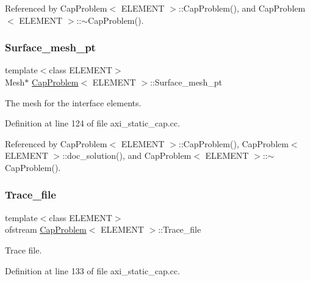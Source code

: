Referenced by Cap\+Problem$<$ E\+L\+E\+M\+E\+N\+T $>$\+::\+Cap\+Problem(), and Cap\+Problem$<$ E\+L\+E\+M\+E\+N\+T $>$\+::$\sim$\+Cap\+Problem().

\mbox{\label{classCapProblem_a557ef36f2db33b81fb3e1828365e66a0}} 
\subsubsection{\texorpdfstring{Surface\+\_\+mesh\+\_\+pt}{Surface\_mesh\_pt}}
{\footnotesize\ttfamily template$<$class E\+L\+E\+M\+E\+NT$>$ \\
Mesh$\ast$ \hyperlink{classCapProblem}{Cap\+Problem}$<$ E\+L\+E\+M\+E\+NT $>$\+::Surface\+\_\+mesh\+\_\+pt\hspace{0.3cm}{\ttfamily [private]}}



The mesh for the interface elements. 



Definition at line 124 of file axi\+\_\+static\+\_\+cap.\+cc.



Referenced by Cap\+Problem$<$ E\+L\+E\+M\+E\+N\+T $>$\+::\+Cap\+Problem(), Cap\+Problem$<$ E\+L\+E\+M\+E\+N\+T $>$\+::doc\+\_\+solution(), and Cap\+Problem$<$ E\+L\+E\+M\+E\+N\+T $>$\+::$\sim$\+Cap\+Problem().

\mbox{\label{classCapProblem_a46ba6cbe3e82a36db8831fdd53d9f3a9}} 
\subsubsection{\texorpdfstring{Trace\+\_\+file}{Trace\_file}}
{\footnotesize\ttfamily template$<$class E\+L\+E\+M\+E\+NT$>$ \\
ofstream \hyperlink{classCapProblem}{Cap\+Problem}$<$ E\+L\+E\+M\+E\+NT $>$\+::Trace\+\_\+file\hspace{0.3cm}{\ttfamily [private]}}



Trace file. 



Definition at line 133 of file axi\+\_\+static\+\_\+cap.\+cc.



